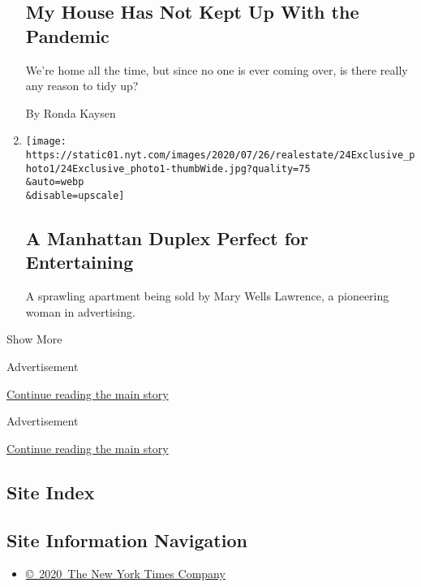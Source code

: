 \begin{enumerate}
{  \subsection{My House Has Not Kept Up With the
  Pandemic}\label{my-house-has-not-kept-up-with-the-pandemic}}

  We're home all the time, but since no one is ever coming over, is
  there really any reason to tidy up?

  By Ronda Kaysen
\item
  \href{/slideshow/2020/07/24/realestate/a-manhattan-duplex-perfect-for-entertaining.html}{}

  \texttt{[image: https://static01.nyt.com/images/2020/07/26/realestate/24Exclusive\_photo1/24Exclusive\_photo1-thumbWide.jpg?quality=75\\\&auto=webp\\\&disable=upscale]}

  \hypertarget{a-manhattan-duplex-perfect-for-entertaining}{%
  \subsection{A Manhattan Duplex Perfect for
  Entertaining}\label{a-manhattan-duplex-perfect-for-entertaining}}

  A sprawling apartment being sold by Mary Wells Lawrence, a pioneering
  woman in advertising.
\end{enumerate}

Show More

Advertisement

\protect\hyperlink{after-mid3}{Continue reading the main story}

Advertisement

\protect\hyperlink{after-mktg}{Continue reading the main story}

\hypertarget{site-index}{%
\subsection{Site Index}\label{site-index}}

\hypertarget{site-information-navigation}{%
\subsection{Site Information
Navigation}\label{site-information-navigation}}

\begin{itemize}
\tightlist
\item
  \href{https://help.nytimes.com/hc/en-us/articles/115014792127-Copyright-notice}{©~2020~The
  New York Times Company}
\end{itemize}

